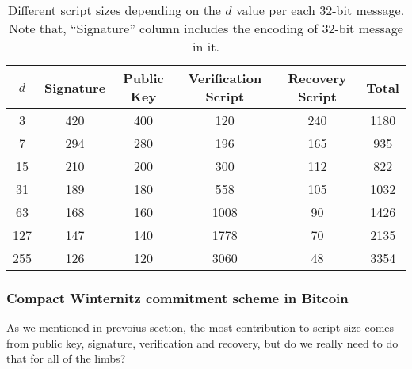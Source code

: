 \documentclass{iacrtrans}
\begin{document}
\iffalse{}
\begin{verbatim}
import math
l = 32
ds = [3, 7, 15, 31, 63, 127, 255]

for d in ds:
    w = math.ceil(math.log(d+1, 2))
    n0 = math.ceil(l / w)
    n1 = math.ceil((2**w * n0).bit_length() / w)
    k = n0 + n1
    
    pk_size = 20 * k
    ver_size = 2 * d * k
    sig_size = 21*k
    rec_size = 0
    for i in range(0, n0):
        rec_size += int(i * w)
    
    total = pk_size + ver_size + rec_size + sig_size
    
    print(f"{d} & {sig_size} & {pk_size} & {ver_size} & {rec_size} & {total} \\\\")
\end{verbatim}
\fi
\begin{table}[H]
  \centering
  \begin{tabular}{cccccc}
    \toprule
    $d$ & \textbf{Signature} & \textbf{Public Key} & \textbf{Verification Script} & \textbf{Recovery Script} & \textbf{Total} \\
    \midrule
    3 & 420 & 400 & 120 & 240 & 1180 \\
    7 & 294 & 280 & 196 & 165 & 935 \\
    15 & 210 & 200 & 300 & 112 & 822 \\
    31 & 189 & 180 & 558 & 105 & 1032 \\
    63 & 168 & 160 & 1008 & 90 & 1426 \\
    127 & 147 & 140 & 1778 & 70 & 2135 \\
    255 & 126 & 120 & 3060 & 48 & 3354 \\
    \bottomrule
  \end{tabular}
  \caption{Different script sizes depending on the $d$ value per each
    32-bit message. Note that, ``Signature'' column includes the
    encoding of 32-bit message in it.}\label{tab:winternitz-script-size}
\end{table}

\subsubsection{Compact Winternitz commitment
  scheme in Bitcoin}\label{sec:compact-winternitz-in-bitcoin}

As we mentioned in prevoius section, the most contribution to script
size comes from public key, signature, verification and recovery, but
do we really need to do that for all of the limbs?
\end{document}
